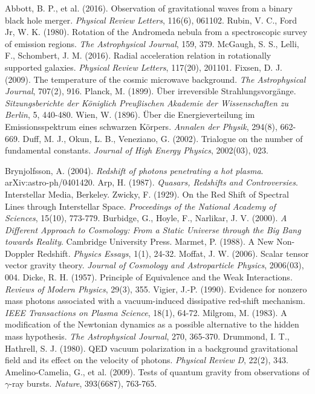\documentclass[12pt,a4paper]{article}
\begin{document}
\begin{thebibliography}{99}
		 Abbott, B. P., et al. (2016). Observation of gravitational waves from a binary black hole merger. \textit{Physical Review Letters}, 116(6), 061102.
		 Rubin, V. C., Ford Jr, W. K. (1980). Rotation of the Andromeda nebula from a spectroscopic survey of emission regions. \textit{The Astrophysical Journal}, 159, 379.
		 McGaugh, S. S., Lelli, F., Schombert, J. M. (2016). Radial acceleration relation in rotationally supported galaxies. \textit{Physical Review Letters}, 117(20), 201101.
		 Fixsen, D. J. (2009). The temperature of the cosmic microwave background. \textit{The Astrophysical Journal}, 707(2), 916.
		 Planck, M. (1899). Über irreversible Strahlungsvorgänge. \textit{Sitzungsberichte der Königlich Preußischen Akademie der Wissenschaften zu Berlin}, 5, 440-480.
		 Wien, W. (1896). Über die Energieverteilung im Emissionsspektrum eines schwarzen Körpers. \textit{Annalen der Physik}, 294(8), 662-669.
		 Duff, M. J., Okun, L. B., Veneziano, G. (2002). Trialogue on the number of fundamental constants. \textit{Journal of High Energy Physics}, 2002(03), 023.
		
		 Brynjolfsson, A. (2004). \textit{Redshift of photons penetrating a hot plasma}. arXiv:astro-ph/0401420.
		 Arp, H. (1987). \textit{Quasars, Redshifts and Controversies}. Interstellar Media, Berkeley.
		 Zwicky, F. (1929). On the Red Shift of Spectral Lines through Interstellar Space. \textit{Proceedings of the National Academy of Sciences}, 15(10), 773-779.
		 Burbidge, G., Hoyle, F., Narlikar, J. V. (2000). \textit{A Different Approach to Cosmology: From a Static Universe through the Big Bang towards Reality}. Cambridge University Press.
		 Marmet, P. (1988). A New Non-Doppler Redshift. \textit{Physics Essays}, 1(1), 24-32.
		 Moffat, J. W. (2006). Scalar tensor vector gravity theory. \textit{Journal of Cosmology and Astroparticle Physics}, 2006(03), 004.
		 Dicke, R. H. (1957). Principle of Equivalence and the Weak Interactions. \textit{Reviews of Modern Physics}, 29(3), 355.
		 Vigier, J.-P. (1990). Evidence for nonzero mass photons associated with a vacuum-induced dissipative red-shift mechanism. \textit{IEEE Transactions on Plasma Science}, 18(1), 64-72.
		 Milgrom, M. (1983). A modification of the Newtonian dynamics as a possible alternative to the hidden mass hypothesis. \textit{The Astrophysical Journal}, 270, 365-370.
		 Drummond, I. T., Hathrell, S. J. (1980). QED vacuum polarization in a background gravitational field and its effect on the velocity of photons. \textit{Physical Review D}, 22(2), 343.
		 Amelino-Camelia, G., et al. (2009). Tests of quantum gravity from observations of $\gamma$-ray bursts. \textit{Nature}, 393(6687), 763-765.
	\end{thebibliography}
	
\end{document}
